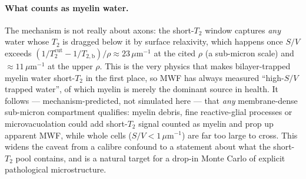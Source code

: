 \paragraph{What counts as myelin water.} The mechanism is not really about axons: the
short-$T_2$ window captures \emph{any} water whose $T_2$ is dragged below it by surface
relaxivity, which happens once $S/V$ exceeds
$(1/T_2^{\mathrm{cut}}-1/T_{2,\mathrm b})/\rho\approx 23\,\mu$m$^{-1}$ at the cited $\rho$
(a sub-micron scale) and $\approx 11\,\mu$m$^{-1}$ at the upper $\rho$. This is the very
physics that makes bilayer-trapped myelin water short-$T_2$ in the first place, so MWF has
always measured ``high-$S/V$ trapped water'', of which myelin is merely the dominant source
in health. It follows --- mechanism-predicted, not simulated here --- that \emph{any}
membrane-dense sub-micron compartment qualifies: myelin debris, fine reactive-glial
processes or microvacuolation could add short-$T_2$ signal counted as myelin and prop up
apparent MWF, while whole cells ($S/V\!<\!1\,\mu$m$^{-1}$) are far too large to cross. This
widens the caveat from a calibre confound to a statement about what the short-$T_2$ pool
contains, and is a natural target for a drop-in Monte Carlo of explicit pathological
microstructure.


